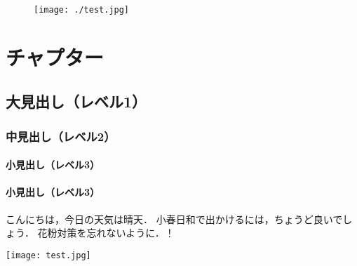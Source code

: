 \documentclass{ltjsbook}
\begin{document}
\begin{figure}[h]
  \vfill
  \hspace{5mm}%
  \begin{minipage}{70mm}%
    \texttt{[image: ./test.jpg]}%
  \end{minipage}%
      \vspace{1em}%
\end{figure}




\chapter{チャプター}
\section{大見出し（レベル1）}
\subsection{中見出し（レベル2）}

\subsubsection{小見出し（レベル3）}%




\subsubsection{小見出し（レベル3）}%
\begin{minipage}[c]{\dimexpr\linewidth-75mm-\leftskip} %
  こんにちは，今日の天気は晴天．
  小春日和で出かけるには，ちょうど良いでしょう．
  花粉対策を忘れないように．！
  \vfill%
\end{minipage}%
\hspace{5mm}%
\begin{minipage}[t]{70mm}
  \texttt{[image: test.jpg]}
  \vspace{1em}
\end{minipage}%
\end{document}
